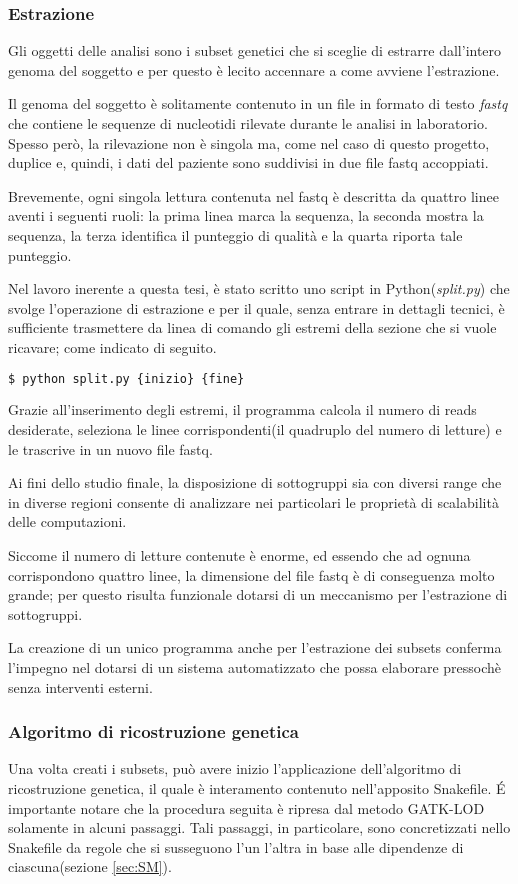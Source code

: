 \subsubsection{Estrazione}
\label{subsubsec: ext}
Gli oggetti delle analisi sono i subset genetici che si sceglie di estrarre dall'intero genoma del soggetto e per questo è lecito accennare a come avviene l'estrazione.

Il genoma del soggetto è solitamente contenuto in un file in formato di testo \textit{fastq} che contiene le sequenze di nucleotidi rilevate durante le analisi in laboratorio.
Spesso però, la rilevazione non è singola ma, come nel caso di questo progetto, duplice e, quindi, i dati del paziente sono suddivisi in due file fastq accoppiati.

Brevemente, ogni singola lettura contenuta nel fastq è descritta da quattro linee aventi i seguenti ruoli: la prima linea marca la sequenza, la seconda mostra la sequenza, la terza identifica il punteggio di qualità e la quarta riporta tale punteggio.


Nel lavoro inerente a questa tesi, è stato scritto uno script in Python(\textit{split.py}) che svolge l'operazione di estrazione e per il quale, senza entrare in dettagli tecnici, è sufficiente trasmettere da linea di comando gli estremi della sezione che si vuole ricavare; come indicato di seguito.
\begin{lstlisting}[language=Python]
$ python split.py {inizio} {fine}
\end{lstlisting}
Grazie all'inserimento degli estremi, il programma calcola il numero di reads desiderate, seleziona le linee corrispondenti(il quadruplo del numero di letture) e le trascrive in un nuovo file fastq.

Ai fini dello studio finale, la disposizione di sottogruppi sia con diversi range che in diverse regioni consente di analizzare nei particolari le proprietà di scalabilità delle computazioni.

Siccome il numero di letture contenute è enorme, ed essendo che ad ognuna corrispondono quattro linee, la dimensione del file fastq è di conseguenza molto grande; per questo risulta funzionale dotarsi di un meccanismo per l'estrazione di sottogruppi.

La creazione di un unico programma anche per l'estrazione dei subsets conferma l'impegno nel dotarsi di un sistema automatizzato che possa elaborare pressochè senza interventi esterni.


\subsubsection{Algoritmo di ricostruzione genetica}
Una volta creati i subsets, può avere inizio l'applicazione dell'algoritmo di ricostruzione genetica, il quale è interamento contenuto nell'apposito Snakefile.
\'E importante notare che la procedura seguita è ripresa dal metodo GATK-LOD solamente in alcuni passaggi.
Tali passaggi, in particolare, sono concretizzati nello Snakefile da regole che si susseguono l'un l'altra in base alle dipendenze di ciascuna(sezione \ref{sec:SM}).

